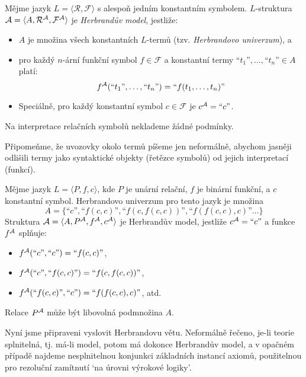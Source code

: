 \begin{definition}
Mějme jazyk $L=\langle\mathcal R,\mathcal F\rangle$ s alespoň jedním konstantním symbolem. $L$-struktura $\mathcal{A}=\langle A,\mathcal R^{\mathcal{A}},\mathcal F^{\mathcal{A}}\rangle$ je \emph{Herbrandův model}, jestliže:
\begin{itemize}
    \item $A$ je množina všech konstantních $L$-termů (tzv. \emph{Herbrandovo univerzum}), a
    \item pro každý $n$-ární funkční symbol $f\in\mathcal F$ a konstantní termy $\text{``$t_1$''},\dots,\text{``$t_n$''}\in A$ platí:
    $$
    f^{\mathcal{A}}(\text{``$t_1$''},\dots,\text{``$t_n$''})=\text{``$f(t_1,\dots,t_n)$''}
    $$
    \item Speciálně, pro každý konstantní symbol $c\in\mathcal F$ je $c^{\mathcal{A}}=\text{``$c$''}$.
\end{itemize}
Na interpretace relačních symbolů neklademe žádné podmínky.
\end{definition}

Připomeňme, že uvozovky okolo termů píšeme jen neformálně, abychom jasněji odlišili termy jako syntaktické objekty (řetězce symbolů) od jejich interpretací (funkcí).

\begin{example}
Mějme jazyk $L=\langle P,f,c\rangle$, kde $P$ je unární relační, $f$ je binární funkční, a $c$ konstantní symbol. Herbrandovo univerzum pro tento jazyk je množina
$$
A=\{\text{``$c$''},\text{``$f(c,c)$''},\text{``$f(c,f(c,c))$''},\text{``$f(f(c,c),c)$''}\dots\}
$$
Struktura $\mathcal{A}=\langle A,P^{\mathcal{A}},f^{\mathcal{A}},c^{\mathcal{A}}\rangle$ je Herbrandův model, jestliže $c^{\mathcal{A}}=\text{``$c$''}$ a funkce $f^{\mathcal{A}}$ splňuje:
\begin{itemize}
    \item $f^{\mathcal{A}}(\text{``$c$''},\text{``$c$''})=\text{``$f(c,c)$''}$,
    \item $f^{\mathcal{A}}(\text{``$c$''},\text{``$f(c,c)$''})=\text{``$f(c,f(c,c))$''}$,
    \item $f^{\mathcal{A}}(\text{``$f(c,c)$''},\text{``$c$''})=\text{``$f(f(c,c),c)$''}$, atd.
\end{itemize}
Relace $P^{\mathcal{A}}$ může být libovolná podmnožina $A$.
\end{example}

Nyní jsme připraveni vyslovit Herbrandovu větu. Neformálně řečeno, je-li teorie splnitelná, tj. má-li model, potom má dokonce Herbrandův model, a v opačném případě najdeme nesplnitelnou konjunkci základních instancí axiomů, použitelnou pro rezoluční zamítnutí `na úrovni výrokové logiky'.


